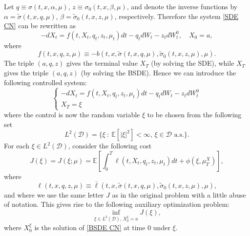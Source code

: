 \documentclass[11pt,a4paper]{article}
\begin{document}
Let $ q \equiv \sigma(t, x, \alpha, \mu)$, $z \equiv \sigma_0(t, x, \beta, \mu)$, and denote the inverse functions by $\alpha=\tilde{\sigma}(t, x, q, \mu)$, $\beta=\tilde{\sigma}_0(t, x, z, \mu)$, respectively.
Therefore the system \eqref{SDE CN} can be rewritten as
\begin{equation*}
      -dX_t=f(t, X_t, q_t, z_t, \mu_t)dt -q_tdW_t-z_tdW_t^0, \quad X_0=a,
\end{equation*}
where  
\[ f(t, x, q, z, \mu) \equiv -b(t, x, \tilde{\sigma}(t, x, q, \mu), \tilde{\sigma}_0(t, x, z, \mu),  \mu).\]
The triple $(a, q, z)$ gives the terminal value $X_T$ (by solving the SDE), while $X_T$ gives the triple $(a,q,z)$ (by solving the BSDE).
Hence we can introduce the following controlled system: 
\begin{equation}
\label{BSDE CN}
\begin{cases}
      -dX_t=f(t, X_t, q_t, z_t, \mu_t)dt-q_tdW_t-z_tdW_t^0\\
      X_T=\xi
\end{cases}
\end{equation}
where the control is now the random variable $\xi$ to be chosen from the following set 
\[
L^2(\mathcal D)=\{ \xi \  : \  \mathbb E[|\xi|^2]< \infty,\, \xi \in \mathcal{D} \text{ a.s.}\}.
\]
For each $\xi \in L^2(\mathcal D)$, consider the following cost
\[
J(\xi)= J(\xi; \mu)=\mathbb E \left[\int_0^T \ell(t, X_t, q_t, z_t, \mu_t)dt+\phi(\xi,\mu_T^X) \right],
\]
where
\[ \ell(t, x, q, z, \mu) \equiv \bar \ell(t, x, \tilde{\sigma}(t, x, q, \mu), \tilde{\sigma}_0(t, x, z, \mu),  \mu),\]
and where we use the same letter $J$ as in the original problem with a little abuse of notation. This gives rise to the following auxiliary optimization problem: 
\begin{equation}
\label{backward CN}
\inf_{\xi \in L^2(\mathcal D),\, X_0 ^\xi =a} 
J(\xi ),
\end{equation}
where $X_0^{\xi}$ is the solution of \eqref{BSDE CN} at time 0 under $\xi$.
\end{document}
